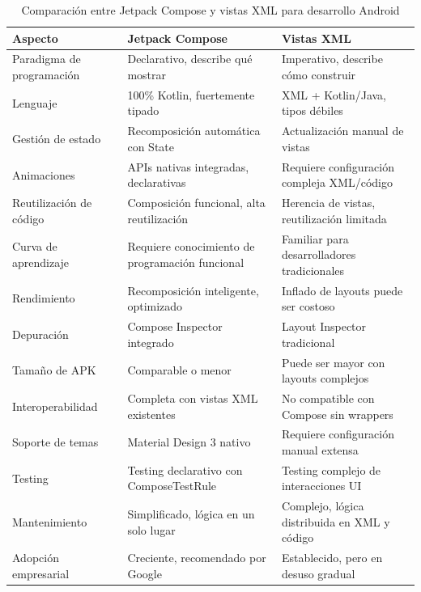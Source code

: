 \begin{table}[H]
\centering
\caption{Comparación entre Jetpack Compose y vistas XML para desarrollo Android}
\label{tab:comparacion_compose_xml}
\begin{tabular}{|p{}|p{}|p{}|}
\hline
\textbf{Aspecto}{\cellcolor[gray]{0.9}} & \textbf{Jetpack Compose}{\cellcolor[gray]{0.9}} & \textbf{Vistas XML}{\cellcolor[gray]{0.9}} \\
\hline
Paradigma de programación & Declarativo, describe qué mostrar & Imperativo, describe cómo construir \\
\hline
Lenguaje & 100\% Kotlin, fuertemente tipado & XML + Kotlin/Java, tipos débiles \\
\hline
Gestión de estado & Recomposición automática con State & Actualización manual de vistas \\
\hline
Animaciones & APIs nativas integradas, declarativas & Requiere configuración compleja XML/código \\
\hline
Reutilización de código & Composición funcional, alta reutilización & Herencia de vistas, reutilización limitada \\
\hline
Curva de aprendizaje & Requiere conocimiento de programación funcional & Familiar para desarrolladores tradicionales \\
\hline
Rendimiento & Recomposición inteligente, optimizado & Inflado de layouts puede ser costoso \\
\hline
Depuración & Compose Inspector integrado & Layout Inspector tradicional \\ 
\hline
Tamaño de APK & Comparable o menor & Puede ser mayor con layouts complejos \\
\hline
Interoperabilidad & Completa con vistas XML existentes & No compatible con Compose sin wrappers \\
\hline
Soporte de temas & Material Design 3 nativo & Requiere configuración manual extensa \\
\hline
Testing & Testing declarativo con ComposeTestRule & Testing complejo de interacciones UI \\
\hline
Mantenimiento & Simplificado, lógica en un solo lugar & Complejo, lógica distribuida en XML y código \\
\hline
Adopción empresarial & Creciente, recomendado por Google & Establecido, pero en desuso gradual \\
\hline
\end{tabular}
\end{table}

